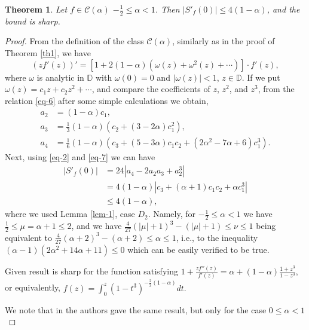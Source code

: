 \documentclass{amsart}
\newtheorem{thm}{Theorem}
\newcommand{\ID}{{\mathbb D}}
\def\be{\begin{equation}}
\def\ee{\end{equation}}
\begin{document}
\medskip


\begin{thm}\label{th2}
Let $f\in\mathcal{C}(\alpha)$ $-\frac{1}{2}\leq \alpha<1$. Then $|S'_{f}(0)|\leq 4(1-\alpha)$, and the bound is sharp.
\end{thm}


\begin{proof} From the definition of the class $\mathcal{C}(\alpha)$, similarly as in the proof of Theorem \ref{th1}, we have
\be\label{eq-6}
\left( z f'(z)\right)'=\left[1+2(1-\alpha)(\omega(z)+\omega^{2}(z)+\cdots)\right]\cdot f'(z),
\ee
where $\omega$ is analytic in $\ID$ with $\omega(0)=0$ and $|\omega(z)|<1$, $z\in\ID$.
If we put $\omega(z)=c_{1}z+c_{2}z^{2}+\cdots$, and compare the coefficients of $z$, $z^{2}$, and $z^{3}$, from the relation \eqref{eq-6} after some simple calculations we obtain,
\be\label{eq-7}
\begin{split}
a_{2}&=(1-\alpha)c_{1}, \\
a_{3}&=\frac{1}{3}(1-\alpha)\left(c_{2}+(3-2\alpha)c_{1}^{2}\right),\\
a_{4}&=\frac{1}{6}(1-\alpha)\left(c_{3}+(5-3\alpha) c_{1}c_{2}+(2\alpha^{2}-7\alpha +6) c_{1}^{3}\right).
\end{split}
\ee
Next, using \eqref{eq-2} and \eqref{eq-7} we can have
\[
\begin{split}
|S'_{f}(0)|&=24|a_{4}-2a_{2}a_{3}+a_{2}^{3}|\\
&=4(1-\alpha)\left|c_{3}+(\alpha+1)c_{1}c_{2}+\alpha c_{1}^{3}\right|\\
&\leq 4(1-\alpha),
\end{split}
\]
where we used Lemma \ref{lem-1}, case $D_{2}$. Namely, for $-\frac{1}{2}\leq \alpha<1$ we have $ \frac{1}{2}\leq \mu=\alpha +1\leq 2 $, and we have
$\frac{4}{27}(|\mu|+1)^{3}-(|\mu|+1)\leq\nu\leq 1$ being equivalent to
$\frac{4}{27}(\alpha+2)^{3}-(\alpha +2)\leq\alpha\leq 1$, i.e., to the inequality
$(\alpha-1)(2\alpha^{2}+14\alpha+11)\leq0$ which can be easily verified to be true.

\medskip

Given result is sharp for the function satisfying
$1+\frac{zf''(z)}{f'(z)}= \alpha +(1-\alpha)\frac{1+z^{3}}{1-z^{3}}$, or equivalently,
$f(z)=\int_{0}^{z}(1-t^{3})^{-\frac{2}{3}(1-\alpha)}dt .$

\medskip

We note that in \cite{QW} the authors gave the same result, but only for the case $0\leq \alpha<1$
\end{proof}
\end{document}
